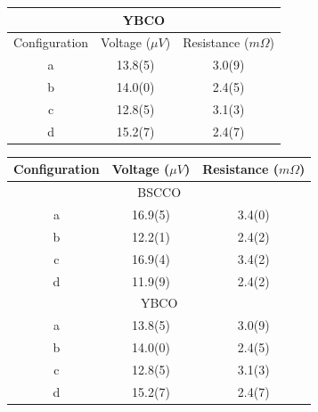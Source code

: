 \documentclass[
reprint,
amsmath,amssymb,
aps,
tikz,
border=5pt
]{revtex4-1}
\begin{document}
    \begin{center}
        \begin{tabular}{ |c|c|c| }
        \hline
        \multicolumn{3}{|c|}{YBCO} \\
        \hline
        Configuration & Voltage ($\mu V$) & Resistance  ($m\Omega$) \\ 
        \hline
        a & 13.8(5) & 3.0(9)  \\ 
        \hline
        b & 14.0(0) & 2.4(5)  \\ 
        \hline
        c & 12.8(5) & 3.1(3) \\ 
        \hline
        d & 15.2(7) & 2.4(7)  \\ 
        \hline
      \end{tabular}
    \end{center}

    \begin{center}
      \begin{tabular}{ |c|c|c| }
        \hline
        Configuration & Voltage ($\mu V$) & Resistance  ($m\Omega$) \\ 
        \hline
        \multicolumn{3}{|c|}{BSCCO} \\
        \hline
        a & 16.9(5) & 3.4(0)  \\ 
        \hline
        b & 12.2(1) & 2.4(2)  \\ 
        \hline
        c & 16.9(4) & 3.4(2)  \\ 
        \hline
        d & 11.9(9) & 2.4(2)  \\ 
        \hline
        \multicolumn{3}{|c|}{YBCO} \\
        \hline
        a & 13.8(5) & 3.0(9)  \\ 
        \hline
        b & 14.0(0) & 2.4(5)  \\ 
        \hline
        c & 12.8(5) & 3.1(3) \\ 
        \hline
        d & 15.2(7) & 2.4(7)  \\ 
        \hline
      \end{tabular}
    \end{center}
{}
\end{document}
